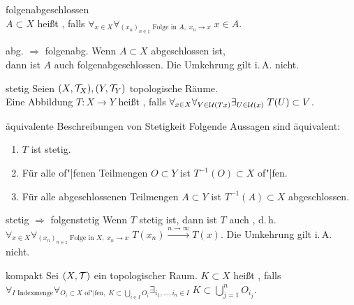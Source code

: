 \begin{Def}{folgenabgeschlossen}\\
    $A \subset X$ heißt , falls
    $\forall_{x \in X} \forall_{(x_n)_{n \in \natural} \text{ Folge in } A,\; x_n \to x}\;
    x \in A$.
\end{Def}

\begin{Satz}{abg. $\Rightarrow$ folgenabg.}
    Wenn $A \subset X$ abgeschlossen ist,\\
    dann ist $A$ auch folgenabgeschlossen.
    Die Umkehrung gilt i.\,A. nicht.
\end{Satz}

\linie

\begin{Def}{stetig}
    Seien $(X, \mathcal{T}_X), (Y, \mathcal{T}_Y)$ topologische Räume.\\
    Eine Abbildung $T\colon X \rightarrow Y$ heißt , falls
    $\forall_{x \in X} \forall_{V \in \mathcal{U}(Tx)} \exists_{U \in \mathcal{U}(x)}\; T(U) \subset V$.
\end{Def}

\begin{Satz}{äquivalente Beschreibungen von Stetigkeit}
    Folgende Aussagen sind äquivalent:
    \begin{enumerate}
        \item
        $T$ ist stetig.

        \item
        Für alle of"|fenen Teilmengen $O \subset Y$ ist $T^{-1}(O) \subset X$ of"|fen.

        \item
        Für alle abgeschlossenen Teilmengen $A \subset Y$ ist $T^{-1}(A) \subset X$ abgeschlossen.
    \end{enumerate}
\end{Satz}

\begin{Satz}{stetig $\Rightarrow$ folgenstetig}
    Wenn $T$ stetig ist, dann ist $T$ auch , d.\,h.\\
    $\forall_{x \in X}
    \forall_{(x_n)_{n \in \natural} \text{ Folge in } X,\; x_n \to x}\;
    T(x_n) \xrightarrow{n \to \infty} T(x)$.
    Die Umkehrung gilt i.\,A. nicht.
\end{Satz}

\linie

\begin{Def}{kompakt}
    Sei $(X, \mathcal{T})$ ein topologischer Raum.
    $K \subset X$ heißt , falls\\
    $\forall_{I \text{ Indexmenge}} \forall_{O_i \subset X \text{ of"|fen},\;
    K \subset \bigcup_{i \in I} O_i} \exists_{i_1, \dotsc, i_n \in I}\;
    K \subset \bigcup_{j=1}^n O_{i_j}$.
\end{Def}

